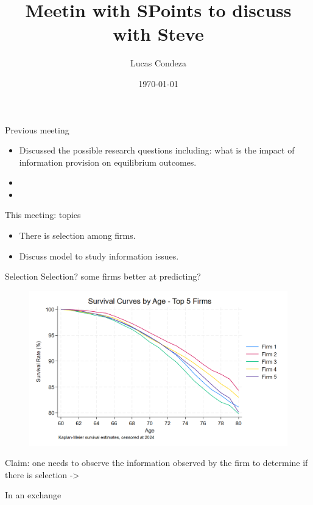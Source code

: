 \documentclass[10pt,aspectratio=169]{beamer}
\title{Meetin with SPoints to discuss with Steve}
\author{%
 Lucas Condeza
\inst{1} \and
}
\institute{
  \inst{1} Yale University \\
}
\date{\today}
\begin{document}






\begin{frame}{Previous meeting}

 \begin{itemize}
        \item Discussed the possible research questions including: what is the impact of information provision on equilibrium outcomes. 
        \item  
        \item  
\end{itemize}
\end{frame}


\begin{frame}{This meeting: topics}

 \begin{itemize}
        \item There is selection among firms. 
        \item Discuss model to study information issues. 
\end{itemize}
\end{frame}


\begin{frame}{Selection}
Selection? some firms better at predicting? 
 \begin{figure}
     \centering
     \includegraphics[width=0.6\linewidth]{figures//IE4/IE4_survival_curves_by_age_top_firms.png}
     \label{fig:placeholder}
 \end{figure}
Claim: one needs to observe the information observed by the firm to determine if there is selection -> 

In an exchange 
\end{frame}
\end{document}
